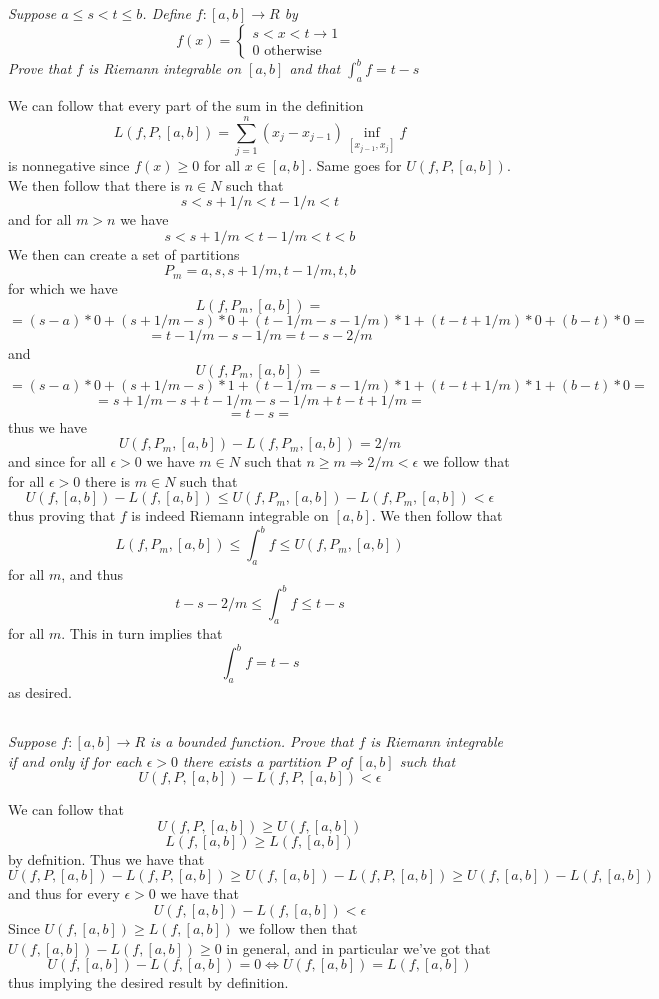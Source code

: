 \documentclass[11pt,oneside,titlepage]{book}
\DeclareMathOperator \lra {\Leftrightarrow}
\DeclareMathOperator \ra {\Rightarrow}
\begin{document}
\subsection{}

\textit{Suppose $a \leq s < t \leq b$. Define $f: [a, b] \to R$ by
$$f(x) =
\begin{cases}
  s < x < t \to 1 \\
  0 \text{ otherwise }
\end{cases}
$$
Prove that $f$ is Riemann integrable on $[a, b]$ and that $\int_a^b{f} = t - s$}

We can follow that every part of the sum in the definition
$$L(f, P, [a, b]) = \sum_{j = 1}^n{(x_j - x_{j - 1})\inf_{[x_{j - 1}, x_j]}{f}}$$
is nonnegative since $f(x) \geq 0$ for all $x \in [a, b]$. Same goes
for $U(f, P, [a, b])$. We then follow that there is $n \in N$ such that
$$s < s + 1/n < t - 1/n < t$$
and for all $m > n$ we have 
$$s < s + 1/m < t - 1/m < t < b$$
We then can create a set of partitions
$$P_m = a, s, s + 1/m, t - 1/m, t, b$$
for which we have
$$L(f, P_m, [a, b]) =$$
$$ = (s - a) * 0 + (s + 1/m - s) * 0 + (t - 1/m - s - 1/m) * 1 + (t - t + 1/m) * 0 + (b - t) * 0 = $$
$$ = t - 1/m - s - 1/m = t - s - 2/m$$
and
$$U(f, P_m, [a, b]) =$$
$$ = (s - a) * 0 + (s + 1/m - s) * 1 + (t - 1/m - s - 1/m) * 1 + (t - t + 1/m) * 1 + (b - t) * 0 = $$
$$ = s + 1/m - s + t - 1/m - s - 1/m + t - t + 1/m = $$
$$ = t - s = $$
thus we have
$$U(f, P_m, [a, b]) - L(f, P_m, [a, b]) = 2/m$$
and since for all $\epsilon > 0$ we have $m \in N$ such that $n \geq m
\ra 2/m < \epsilon$ we follow that for all $\epsilon > 0$ there is $m
\in N$ such that
$$U(f, [a, b]) - L(f, [a, b]) \leq U(f, P_m, [a, b]) - L(f, P_m, [a, b]) < \epsilon$$
thus proving that $f$ is indeed Riemann integrable on $[a, b]$. We
then follow that
$$L(f, P_m, [a, b]) \leq \int_a^b{f} \leq U(f, P_m, [a, b])$$
for all $m$, and thus
$$t - s - 2/m \leq \int_a^b{f} \leq t - s$$
for all $m$. This in turn implies that
$$\int_a^b{f} = t - s$$
as desired.

\subsection{}

\textit{Suppose $f: [a, b] \to R$ is a bounded function. Prove that $f$ is Riemann integrable
  if and only if for each $\epsilon > 0$ there exists a partition $P$ of $[a, b]$ such that
  $$U(f, P, [a, b]) - L(f, P, [a, b]) < \epsilon$$
}

We can follow that
$$U(f, P, [a, b]) \geq U(f, [a, b]) $$
$$L(f, [a, b]) \geq L(f, [a, b]) $$
by defnition. Thus we have that
$$U(f, P, [a, b]) - L(f, P, [a, b]) \geq U(f, [a, b]) - L(f, P, [a, b])
\geq U(f, [a, b]) - L(f, [a, b]) $$
and thus for every $\epsilon > 0$ we have that
$$U(f, [a, b]) - L(f, [a, b]) < \epsilon$$
Since $U(f, [a, b]) \geq L(f, [a, b])$ we follow then that $U(f, [a,
b]) - L(f, [a, b]) \geq 0$ in general, and in particular we've got
that
$$U(f, [a, b]) - L(f, [a, b]) = 0 \lra U(f, [a, b]) = L(f, [a, b]) $$
thus implying the desired result by definition.
\end{document}
